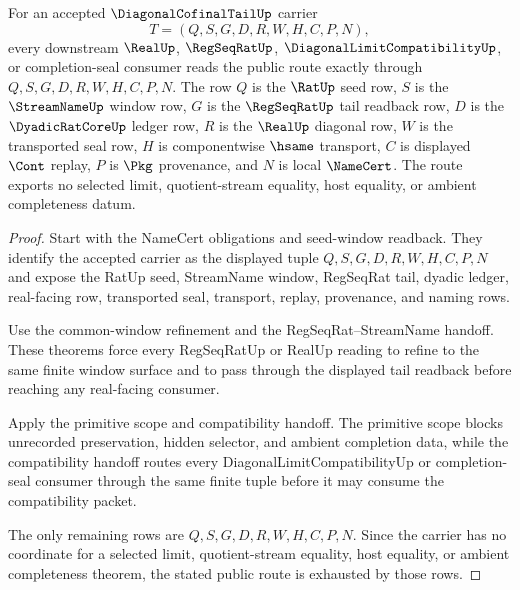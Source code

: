 \begin{theorem}
\label{thm:diagonal-cofinal-tail-public-route}
For an accepted $\DiagonalCofinalTailUp$ carrier
$$
T=(Q,S,G,D,R,W,H,C,P,N),
$$
every downstream $\RealUp$, $\RegSeqRatUp$, $\DiagonalLimitCompatibilityUp$, or completion-seal consumer reads the public route exactly through $Q,S,G,D,R,W,H,C,P,N$. The row $Q$ is the $\RatUp$ seed row, $S$ is the $\StreamNameUp$ window row, $G$ is the $\RegSeqRatUp$ tail readback row, $D$ is the $\DyadicRatCoreUp$ ledger row, $R$ is the $\RealUp$ diagonal row, $W$ is the transported seal row, $H$ is componentwise $\hsame$ transport, $C$ is displayed $\Cont$ replay, $P$ is $\Pkg$ provenance, and $N$ is local $\NameCert$. The route exports no selected limit, quotient-stream equality, host equality, or ambient completeness datum.
\end{theorem}
\begin{proof}
Start with the NameCert obligations and seed-window readback. They identify the accepted carrier as the displayed tuple $Q,S,G,D,R,W,H,C,P,N$ and expose the RatUp seed, StreamName window, RegSeqRat tail, dyadic ledger, real-facing row, transported seal, transport, replay, provenance, and naming rows.

Use the common-window refinement and the RegSeqRat--StreamName handoff. These theorems force every RegSeqRatUp or RealUp reading to refine to the same finite window surface and to pass through the displayed tail readback before reaching any real-facing consumer.

Apply the primitive scope and compatibility handoff. The primitive scope blocks unrecorded preservation, hidden selector, and ambient completion data, while the compatibility handoff routes every DiagonalLimitCompatibilityUp or completion-seal consumer through the same finite tuple before it may consume the compatibility packet.

The only remaining rows are $Q,S,G,D,R,W,H,C,P,N$. Since the carrier has no coordinate for a selected limit, quotient-stream equality, host equality, or ambient completeness theorem, the stated public route is exhausted by those rows.
\end{proof}

